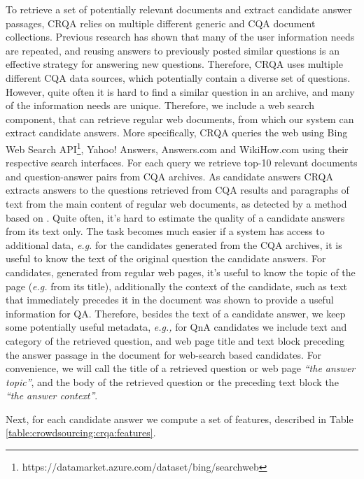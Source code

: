 To retrieve a set of potentially relevant documents and extract candidate answer passages, CRQA relies on multiple different generic and CQA document collections.
Previous research \cite{Shtok:2012:LPA:2187836.2187939} has shown that many of the user information needs are repeated, and reusing answers to previously posted similar questions is an effective strategy for answering new questions.
Therefore, CRQA uses multiple different CQA data sources, which potentially contain a diverse set of questions.
However, quite often it is hard to find a similar question in an archive, and many of the information needs are unique.
Therefore, we include a web search component, that can retrieve regular web documents, from which our system can extract candidate answers.
More specifically, CRQA queries the web using Bing Web Search API\footnote{https://datamarket.azure.com/dataset/bing/searchweb}, Yahoo! Answers, Answers.com and WikiHow.com using their respective search interfaces.
For each query we retrieve top-10 relevant documents and question-answer pairs from CQA archives.
As candidate answers CRQA extracts answers to the questions retrieved from CQA results and paragraphs of text from the main content of regular web documents, as detected by a method based on \cite{Kohlschutter_2010}.
Quite often, it's hard to estimate the quality of a candidate answers from its text only.
The task becomes much easier if a system has access to additional data, \textit{e.g.} for the candidates generated from the CQA archives, it is useful to know the text of the original question the candidate answers.
For candidates, generated from regular web pages, it's useful to know the topic of the page (\textit{e.g.} from its title), additionally the context of the candidate, such as text that immediately precedes it in the document was shown to provide a useful information for QA.
Therefore, besides the text of a candidate answer, we keep some potentially useful metadata, \textit{e.g.,} for QnA candidates we include text and category of the retrieved question, and web page title and text block preceding the answer passage in the document for web-search based candidates.
For convenience, we will call the title of a retrieved question or web page \textit{``the answer topic''}, and the body of the retrieved question or the preceding text block the \textit{``the answer context''}.

Next, for each candidate answer we compute a set of features, described in Table \ref{table:crowdsourcing:crqa:features}.

